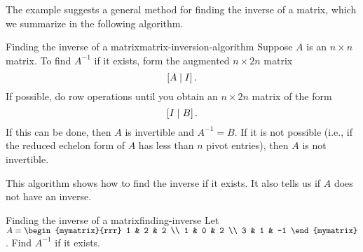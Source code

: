 The example suggests a general method for finding the inverse of a
matrix, which we summarize in the following algorithm.

\begin{algorithm}{Finding the inverse of a matrix}{matrix-inversion-algorithm}
  Suppose $A$ is an $n\times n$ matrix. To find $A^{-1}$ if it
  exists, form the augmented
  $n\times 2n$ matrix
  \begin{equation*}
    \left[A\mid I\right].
  \end{equation*}
  If possible, do row operations until you obtain an $n\times 2n$
  matrix of the form
  \begin{equation*}
    \left[I\mid B\right].
  \end{equation*}
  If this can be done, then $A$ is invertible and $A^{-1}=B$. If it is
  not possible (i.e., if the reduced echelon form of $A$ has less than
  $n$ pivot entries), then $A$ is not invertible.
\end{algorithm}

This algorithm shows how to find the inverse if it exists. It also
tells us if $A$ does not have an inverse.

\begin{example}{Finding the inverse of a matrix}{finding-inverse}
  Let $A=\begin{mymatrix}{rrr}
    1 & 2 & 2 \\
    1 & 0 & 2 \\
    3 & 1 & -1
  \end{mymatrix}$. Find $A^{-1}$ if it exists.
\end{example}

